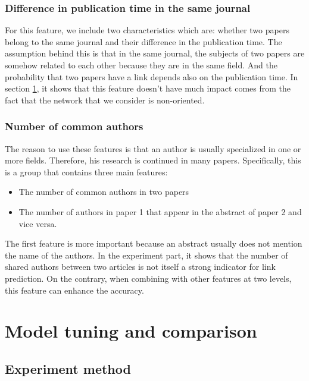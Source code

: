 \documentclass{article}
\begin{document}
\subsubsection{Difference in publication time in the same journal}

For this feature, we include two characteristics which are: whether two papers belong to the same journal and their difference in the publication time. The assumption behind this is that in the same journal, the subjects of two papers are somehow related to each other because they are in the same field. And the probability that two papers have a link depends also on the publication time. In section \ref{sec:experiments}, it shows that this feature doesn't have much impact comes from the fact that the network that we consider is non-oriented.

\subsubsection{Number of common authors}

The reason to use these features is that an author is usually specialized in one or more fields. Therefore, his research is continued in many papers. Specifically, this is a group that contains three main features:
\begin{itemize}
\item The number of common authors in two papers
\item The number of authors in paper 1 that appear in the abstract of paper 2 and vice versa.
\end{itemize}
The first feature is more important because an abstract usually does not mention the name of the authors. In the experiment part, it shows that the number of shared authors between two articles is not itself a strong indicator for link prediction. On the contrary, when combining with other features at two levels, this feature can enhance the accuracy.

\section{Model tuning and comparison}
\label{sec:experiments}

\subsection{Experiment method}
\end{document}
